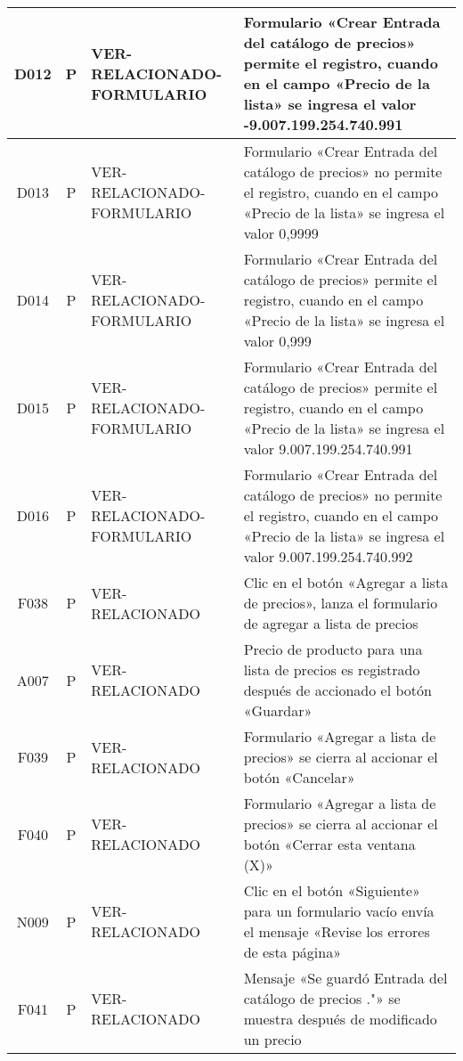\begin{landscape}
{\begin{longtable}[htb]{|c|c|p{3.8cm}|p{15.2cm}|}
\scriptsize{D012} & \scriptsize{P} & \scriptsize{VER-RELACIONADO-FORMULARIO} & \scriptsize{Formulario «Crear Entrada del catálogo de precios» permite el registro, cuando en el campo «Precio de la lista» se ingresa el valor -9.007.199.254.740.991} \\ \hline
\scriptsize{D013} & \scriptsize{P} & \scriptsize{VER-RELACIONADO-FORMULARIO} & \scriptsize{Formulario «Crear Entrada del catálogo de precios» no permite el registro, cuando en el campo «Precio de la lista» se ingresa el valor 0,9999} \\ \hline
\scriptsize{D014} & \scriptsize{P} & \scriptsize{VER-RELACIONADO-FORMULARIO} & \scriptsize{Formulario «Crear Entrada del catálogo de precios» permite el registro, cuando en el campo «Precio de la lista» se ingresa el valor 0,999} \\ \hline
\scriptsize{D015} & \scriptsize{P} & \scriptsize{VER-RELACIONADO-FORMULARIO} & \scriptsize{Formulario «Crear Entrada del catálogo de precios» permite el registro, cuando en el campo «Precio de la lista» se ingresa el valor 9.007.199.254.740.991} \\ \hline
\scriptsize{D016} & \scriptsize{P} & \scriptsize{VER-RELACIONADO-FORMULARIO} & \scriptsize{Formulario «Crear Entrada del catálogo de precios» no permite el registro, cuando en el campo «Precio de la lista» se ingresa el valor 9.007.199.254.740.992} \\ \hline
\scriptsize{F038} & \scriptsize{P} & \scriptsize{VER-RELACIONADO} & \scriptsize{Clic en el botón «Agregar a lista de precios», lanza el formulario de agregar a lista de precios} \\ \hline
\scriptsize{A007} & \scriptsize{P} & \scriptsize{VER-RELACIONADO} & \scriptsize{Precio de producto para una lista de precios es registrado después de accionado el botón «Guardar»} \\ \hline
\scriptsize{F039} & \scriptsize{P} & \scriptsize{VER-RELACIONADO} & \scriptsize{Formulario «Agregar a lista de precios» se cierra al accionar el botón «Cancelar»} \\ \hline
\scriptsize{F040} & \scriptsize{P} & \scriptsize{VER-RELACIONADO} & \scriptsize{Formulario «Agregar a lista de precios» se cierra al accionar el botón «Cerrar esta ventana (X)»} \\ \hline
\scriptsize{N009} & \scriptsize{P} & \scriptsize{VER-RELACIONADO} & \scriptsize{Clic en el botón «Siguiente» para un formulario vacío envía el mensaje «Revise los errores de esta página»} \\ \hline
\scriptsize{F041} & \scriptsize{P} & \scriptsize{VER-RELACIONADO} & \scriptsize{Mensaje «Se guardó Entrada del catálogo de precios ."» se muestra después de modificado un precio} \\ \hline

\end{longtable}}
\end{landscape}
